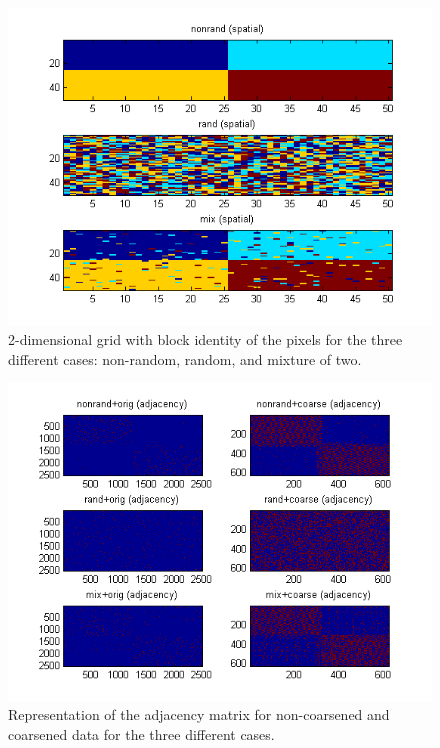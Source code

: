 \documentclass[12pt]{article}
\begin{document}



\begin{figure}[p]
\centering
\includegraphics{Fig1.png}
\caption{2-dimensional grid with block identity of the pixels for the three
different cases: non-random, random, and mixture of two.}
\end{figure}

\begin{figure}[p]
\includegraphics{Fig2.png}
\caption{Representation of the adjacency matrix for non-coarsened and coarsened
data for the three different cases.}
\end{figure}
\end{document}
